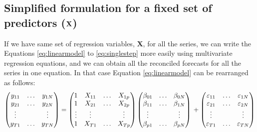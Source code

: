 \documentclass[11pt,a4paper,]{article}
\begin{document}
\hypertarget{simplified-formulation-for-a-fixed-set-of-predictors-bf-x}{%
\subsection{\texorpdfstring{Simplified formulation for a fixed set of predictors (\(\bf {X}\)) \label{sec:proposedapproach2}}{Simplified formulation for a fixed set of predictors (\textbackslash{}bf \{X\}) }}\label{simplified-formulation-for-a-fixed-set-of-predictors-bf-x}}

If we have same set of regression variables, \(\bm{X}\), for all the series, we can write the Equations \eqref{eq:linearmodel} to \eqref{eq:singlestep} more easily using multivariate regression equations, and we can obtain all the reconciled forecasts for all the series in one equation. In that case Equation \eqref{eq:linearmodel} can be rearranged as follows:
\begin{equation}\label{eq:linearmodelsameX}
  \begin{pmatrix}
  y_{11} & \dots & y_{1N}\\
  y_{21} & \dots & y_{2N}\\
  \vdots &       & \vdots\\
  y_{T1} & \dots & y_{TN}
  \end{pmatrix} =
  \begin{pmatrix}
  1      & X_{11} & \dots & X_{1p}\\
  1      & X_{21} & \dots & X_{2p}\\
  \vdots & \vdots &       & \vdots\\
  1      & X_{T1} & \dots & X_{Tp}
  \end{pmatrix}
  \begin{pmatrix}
  \beta_{01} & \dots & \beta_{0N}\\
  \beta_{11} & \dots & \beta_{1N}\\
  \vdots     &       & \vdots\\
  \beta_{p1} & \dots & \beta_{pN}
  \end{pmatrix} \\
  +
  \begin{pmatrix}
  \varepsilon_{11} & \dots & \varepsilon_{1N}\\
  \varepsilon_{21} & \dots & \varepsilon_{2N}\\
  \vdots           &       & \vdots\\
  \varepsilon_{T1} & \dots & \varepsilon_{TN}
  \end{pmatrix}
\end{equation}
\end{document}
